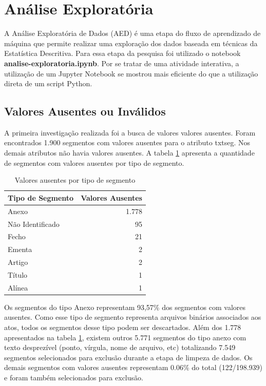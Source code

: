 \section{Análise Exploratória}

A Análise Exploratória de Dados (AED) é uma etapa do fluxo de aprendizado de máquina que permite realizar uma exploração dos dados baseada em técnicas da Estatística Descritiva. Para essa etapa da pesquisa foi utilizado o notebook \textbf{analise-exploratoria.ipynb}. Por se tratar de uma atividade interativa, a utilização de um Jupyter Notebook se mostrou mais eficiente do que a utilização direta de um script Python.

\subsection{Valores Ausentes ou Inválidos}

A primeira investigação realizada foi a busca de valores valores ausentes. Foram encontrados 1.900 segmentos com valores ausentes para o atributo txt\textunderscore seg. Nos demais atributos não havia valores ausentes. A tabela \ref{tab:valores-ausentes} apresenta a quantidade de segmentos com valores ausentes por tipo de segmento.

\begin{table}[h] 
\caption{Valores ausentes por tipo de segmento}
\label{tab:valores-ausentes}
	\begin{center} 
		\begin{tabular}{lr} 
			\toprule			
			Tipo de Segmento & Valores Ausentes \\
			\midrule
			Anexo & 1.778 \\
			Não Identificado & 95 \\			
			Fecho & 21 \\
			Ementa & 2 \\			
			Artigo & 2 \\
			Título & 1 \\
			Alínea & 1 \\			
			\bottomrule
		\end{tabular}
	\end{center}
	\fdp
\end{table} 

Os segmentos do tipo Anexo representam 93,57\% dos segmentos com valores ausentes. Como esse tipo de segmento representa arquivos binários associados aos atos, todos os segmentos desse tipo podem ser descartados. Além dos 1.778 apresentados na tabela \ref{tab:valores-ausentes}, existem outros 5.771 segmentos do tipo anexo com texto desprezível (ponto, vírgula, nome de arquivo, etc) totalizando 7.549 segmentos selecionados para exclusão durante a etapa de limpeza de dados. Os demais segmentos com valores ausentes representam 0.06\% do total (122/198.939) e foram também selecionados para exclusão.

